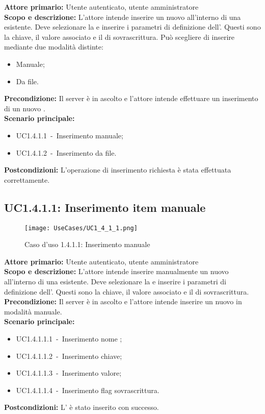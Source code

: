 \documentclass{scalatekids-article}
\begin{document}
\textbf{Attore primario:} Utente autenticato, utente amministratore\\
\textbf{Scopo e descrizione:} L'attore intende inserire un nuovo  all'interno di una  esistente. Deve selezionare la  e inserire i parametri di definizione dell'. Questi sono la chiave, il valore associato e il  di sovrascrittura. Può scegliere di inserire mediante due modalità distinte:
\begin{itemize}
\item Manuale;
\item Da file.
\end{itemize}
\textbf{Precondizione:} Il server è in ascolto e l'attore intende effettuare un inserimento di un nuovo .\\
\textbf{Scenario principale:}
\begin{itemize}
\item UC1.4.1.1\ -\ Inserimento  manuale;
\item UC1.4.1.2\ -\ Inserimento  da file.
\end{itemize}
\textbf{Postcondizioni:} L'operazione di inserimento richiesta è stata effettuata correttamente.

\subsection{UC1.4.1.1: Inserimento item manuale}

\begin{figure}[H]
  \begin{center}
    \texttt{[image: UseCases/UC1\_4\_1\_1.png]}
    \caption*{Caso d'uso 1.4.1.1: Inserimento  manuale}
  \end{center}
\end{figure}
\textbf{Attore primario:} Utente autenticato, utente amministratore\\
\textbf{Scopo e descrizione:} L'attore intende inserire manualmente un nuovo  all'interno di una  esistente. Deve selezionare la  e inserire i parametri di definizione dell'. Questi sono la chiave, il valore associato e il  di sovrascrittura.\\
\textbf{Precondizione:} Il server è in ascolto e l'attore intende inserire un nuovo  in modalità manuale.\\
\textbf{Scenario principale:}
\begin{itemize}
\item UC1.4.1.1.1\ -\ Inserimento nome ;
\item UC1.4.1.1.2\ -\ Inserimento chiave;
\item UC1.4.1.1.3\ -\ Inserimento valore;
\item UC1.4.1.1.4\ -\ Inserimento flag sovrascrittura.
\end{itemize}
\textbf{Postcondizioni:} L' è stato inserito con successo.
\end{document}
